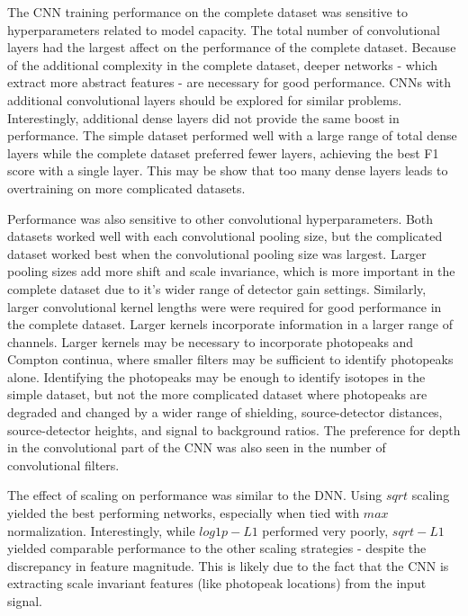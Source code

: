 The CNN training performance on the complete dataset was sensitive to hyperparameters related to model capacity. The total number of convolutional layers had the largest affect on the performance of the complete dataset. Because of the additional complexity in the complete dataset, deeper networks - which extract more abstract features - are necessary for good performance. CNNs with additional convolutional layers should be explored for similar problems. Interestingly, additional dense layers did not provide the same boost in performance. The simple dataset performed well with a large range of total dense layers while the complete dataset preferred fewer layers, achieving the best F1 score with a single layer. This may be show that too many dense layers leads to overtraining on more complicated datasets. 

Performance was also sensitive to other convolutional hyperparameters. Both datasets worked well with each convolutional pooling size, but the complicated dataset worked best when the convolutional pooling size was largest. Larger pooling sizes add more shift and scale invariance, which is more important in the complete dataset due to it's wider range of detector gain settings. Similarly, larger convolutional kernel lengths were were required for good performance in the complete dataset. Larger kernels incorporate information in a larger range of channels. Larger kernels may be necessary to incorporate photopeaks and Compton continua, where smaller filters may be sufficient to identify photopeaks alone. Identifying the photopeaks may be enough to identify isotopes in the simple dataset, but not the more complicated dataset where photopeaks are degraded and changed by a wider range of shielding, source-detector distances, source-detector heights, and signal to background ratios. The preference for depth in the convolutional part of the CNN was also seen in the number of convolutional filters.

The effect of scaling on performance was similar to the DNN. Using $sqrt$ scaling yielded the best performing networks, especially when tied with $max$ normalization. Interestingly, while $log1p-L1$ performed very poorly, $sqrt-L1$ yielded comparable performance to the other scaling strategies - despite the discrepancy in feature magnitude. This is likely due to the fact that the CNN is extracting scale invariant features (like photopeak locations) from the input signal.


